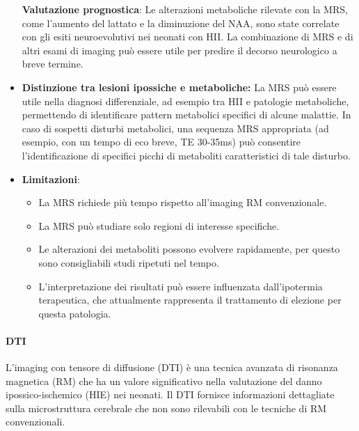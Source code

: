 \begin{itemize}
	\textbf{Valutazione prognostica}: Le alterazioni metaboliche rilevate con la MRS, come l'aumento del lattato e la diminuzione del NAA, sono state correlate con gli esiti neuroevolutivi nei neonati con HII. La combinazione di MRS e di altri esami di imaging può essere utile per predire il decorso neurologico a breve termine.
	\item
	\textbf{Distinzione tra lesioni ipossiche e metaboliche:} La MRS può essere utile nella diagnosi differenziale, ad esempio tra HII e patologie metaboliche, permettendo di identificare pattern metabolici specifici di alcune malattie. In caso di sospetti disturbi metabolici, una sequenza MRS appropriata (ad esempio, con un tempo di eco breve, TE 30-35ms) può consentire l'identificazione di specifici picchi di metaboliti caratteristici di tale disturbo.
	\item
	\textbf{Limitazioni}:
	
	\begin{itemize}
		\tightlist
		\item
		La MRS richiede più tempo rispetto all'imaging RM convenzionale.
		\item
		La MRS può studiare solo regioni di interesse specifiche.
		\item
		Le alterazioni dei metaboliti possono evolvere rapidamente, per questo sono consigliabili studi ripetuti nel tempo.
		\item
		L'interpretazione dei risultati può essere influenzata dall'ipotermia terapeutica, che attualmente rappresenta il trattamento di elezione per questa patologia.
	\end{itemize}
\end{itemize}

\paragraph{DTI} L'imaging con tensore di diffusione (DTI) è una tecnica avanzata di risonanza magnetica (RM) che ha un valore significativo nella valutazione del danno ipossico-ischemico (HIE) nei neonati. Il DTI fornisce informazioni dettagliate sulla microstruttura cerebrale che non sono rilevabili con le tecniche di RM convenzionali.

